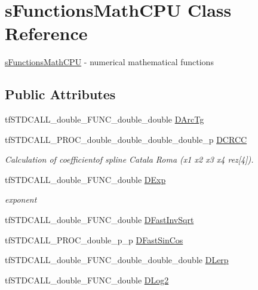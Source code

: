 \hypertarget{structs_functions_math_c_p_u}{\section{s\-Functions\-Math\-C\-P\-U Class Reference}
\label{structs_functions_math_c_p_u}
}


\hyperlink{structs_functions_math_c_p_u}{s\-Functions\-Math\-C\-P\-U} -\/ numerical mathematical functions  


\subsection*{Public Attributes}
\begin{DoxyCompactItemize}
\item 
tf\-S\-T\-D\-C\-A\-L\-L\-\_\-double\-\_\-\-F\-U\-N\-C\-\_\-double\-\_\-double \hyperlink{structs_functions_math_c_p_u_a558bf5c516c2ad1325f9de1a364b9265}{D\-Arc\-Tg}
\item 
\hypertarget{structs_functions_math_c_p_u_a141e7b715132c2f84b004c258e5b5680}{tf\-S\-T\-D\-C\-A\-L\-L\-\_\-\-P\-R\-O\-C\-\_\-double\-\_\-double\-\_\-double\-\_\-double\-\_\-p \hyperlink{structs_functions_math_c_p_u_a141e7b715132c2f84b004c258e5b5680}{D\-C\-R\-C\-C}}\label{structs_functions_math_c_p_u_a141e7b715132c2f84b004c258e5b5680}

\begin{DoxyCompactList}\small\item\em Calculation of coefficientof spline Catala Roma (x1 x2 x3 x4 rez\mbox{[}4\mbox{]}). \end{DoxyCompactList}\item 
\hypertarget{structs_functions_math_c_p_u_a7462a239d085877dd813d77cf4da58e2}{tf\-S\-T\-D\-C\-A\-L\-L\-\_\-double\-\_\-\-F\-U\-N\-C\-\_\-double \hyperlink{structs_functions_math_c_p_u_a7462a239d085877dd813d77cf4da58e2}{D\-Exp}}\label{structs_functions_math_c_p_u_a7462a239d085877dd813d77cf4da58e2}

\begin{DoxyCompactList}\small\item\em exponent \end{DoxyCompactList}\item 
tf\-S\-T\-D\-C\-A\-L\-L\-\_\-double\-\_\-\-F\-U\-N\-C\-\_\-double \hyperlink{structs_functions_math_c_p_u_ace8f80905e985a37f8212c0fd805c9e4}{D\-Fast\-Inv\-Sqrt}
\item 
tf\-S\-T\-D\-C\-A\-L\-L\-\_\-\-P\-R\-O\-C\-\_\-double\-\_\-p\-\_\-p \hyperlink{structs_functions_math_c_p_u_a1338de939a5f834cbf437a3df3183464}{D\-Fast\-Sin\-Cos}
\item 
tf\-S\-T\-D\-C\-A\-L\-L\-\_\-double\-\_\-\-F\-U\-N\-C\-\_\-double\-\_\-double\-\_\-double \hyperlink{structs_functions_math_c_p_u_a8b010e8edcb0e631cad05c83ad29d6b8}{D\-Lerp}
\item 
\hypertarget{structs_functions_math_c_p_u_a0cb7845be4dc146ecd3cce44d321ef65}{tf\-S\-T\-D\-C\-A\-L\-L\-\_\-double\-\_\-\-F\-U\-N\-C\-\_\-double \hyperlink{structs_functions_math_c_p_u_a0cb7845be4dc146ecd3cce44d321ef65}{D\-Log2}}\label{structs_functions_math_c_p_u_a0cb7845be4dc146ecd3cce44d321ef65}


\end{DoxyCompactItemize}
